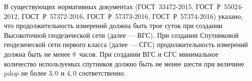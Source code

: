 \newcommand{\tabSoftMs}[3]{ %
	\DTLsetseparator{;} %
	\DTLloaddb{tablezdata}{#3} %
	\begin{table} [htbp]%
		\centering\small%
		\begin{threeparttable}%
			\captionof{table}{Результаты оценки точности $\mathbf{m_{S}}$\,(\textit{м}) при уравнивании различными способами для сети #1}\label{tab:tab#2ref}%
			\sisetup{%
				table-figures-integer = 3%
			}{%
				\begin{tabular}{ccccccc} %
					\toprule %
					\textbf{Интервал,}	& %
					\multicolumn{2}{c}{\textbf{RTX обработка} }	& %
					\multicolumn{2}{c}{\textbf{CSRS} }		& %
					\multicolumn{2}{c}{\textbf{Статика CREDO TIM} }	\\ %
					\textit{ч.}			& %
					$\mathbf{m_{xy}}$\textit{, м}	& %
					$\mathbf{m_{z}}$\textit{, м}	& %
					$\mathbf{m_{xy}}$\textit{, м}	& %
					$\mathbf{m_{z}}$\textit{, м}	& %
					$\mathbf{m_{xy}}$\textit{, м}	& %
					$\mathbf{m_{z}}$\textit{, м}	\\ %
					\midrule %
					\DTLforeach{tablezdata}{\intT=intT,\RTXxy=RTXxy,\RTXz=RTXz,\CSRSxy=CSRSxy,\CSRSz=CSRSz,\CREDOxy=CREDOxy,\CREDOz=CREDOz}%
					{ $\mathbf{\intT}$	& $\RTXxy$	& $\RTXz$	& $\CSRSxy$	& $\CSRSz$	& $\CREDOxy$	& $\CREDOz$	\DTLiflastrow{}{\tabularnewline}}%
					\tabularnewline	\bottomrule%
				\end{tabular}%
			}%
		\end{threeparttable}%
	\end{table}%
	\DTLdeletedb{tablezdata}
	
} %

\ifsynopsis %
В существующих нормативных документах 
(ГОСТ~33472-2015, ГОСТ~Р~55024-2012, ГОСТ~Р~57372-2016, ГОСТ~Р~57373-2016, ГОСТ~Р~57374-2016)  
указано, что продолжительность измерений должна быть трое суток при создании Высокоточной геодезической сети (далее --- ВГС). При создании Спутниковой геодезической сети первого класса (далее --- СГС) продолжительность измерений должна быть не менее $8$~часов. При создании ВГС и СГС минимальное количество используемых спутников должно быть не менее шести при величине pdop не более $3,0$ и $4,0$ соответственно.


